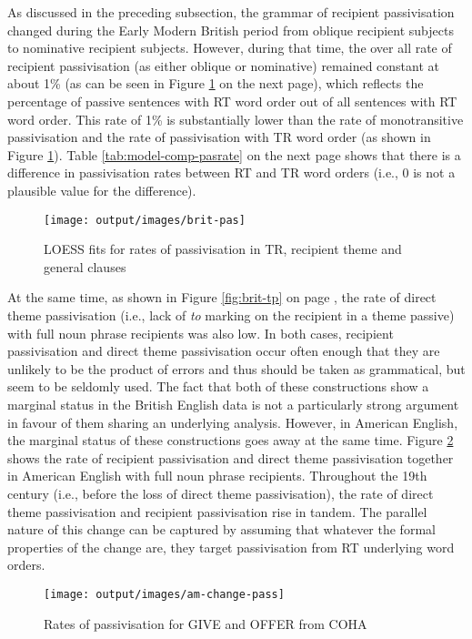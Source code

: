 	As discussed in the preceding subsection, the grammar of recipient passivisation changed during the Early Modern British period from oblique recipient subjects to nominative recipient subjects. However, during that time, the over all rate of recipient passivisation (as either oblique or nominative) remained constant at about 1\% (as can be seen in Figure \ref{fig:brit-pas} on the next page), which reflects the percentage of passive sentences with RT word order out of all sentences with RT word order. This rate of 1\% is substantially lower than the rate of monotransitive passivisation and the rate of passivisation with TR word order (as shown in Figure \ref{fig:brit-pas}). Table \ref{tab:model-comp-pasrate} on the next page shows that there is a difference in passivisation rates between RT and TR word orders (i.e., 0 is not a plausible value for the difference).
	

	\begin{figure}[ht!]
		\texttt{[image: output/images/brit-pas]}
		\caption{LOESS fits for rates of passivisation in TR, recipient theme and general clauses}
		\label{fig:brit-pas}
	\end{figure}

	At the same time, as shown in Figure \ref{fig:brit-tp} on page \pageref{fig:brit-tp}, the rate of direct theme passivisation (i.e., lack of \textit{to} marking on the recipient in a theme passive) with full noun phrase recipients was also low. In both cases, recipient passivisation and direct theme passivisation occur often enough that they are unlikely to be the product of errors and thus should be taken as grammatical, but seem to be seldomly used. The fact that both of these constructions show a marginal status in the British English data is not a particularly strong argument in favour of them sharing an underlying analysis. However, in American English, the marginal status of these constructions goes away at the same time. Figure \ref{fig:am-change-pass} shows the rate of recipient passivisation and direct theme passivisation together in American English with full noun phrase recipients. Throughout the 19th century (i.e., before the loss of direct theme passivisation), the rate of direct theme passivisation and recipient passivisation rise in tandem. The parallel nature of this change can be captured by assuming that whatever the formal properties of the change are, they target passivisation from RT underlying word orders.

	\begin{figure}[ht!]
		\texttt{[image: output/images/am-change-pass]}
		\caption{Rates of passivisation for GIVE and OFFER from COHA}
		\label{fig:am-change-pass}
	\end{figure}

